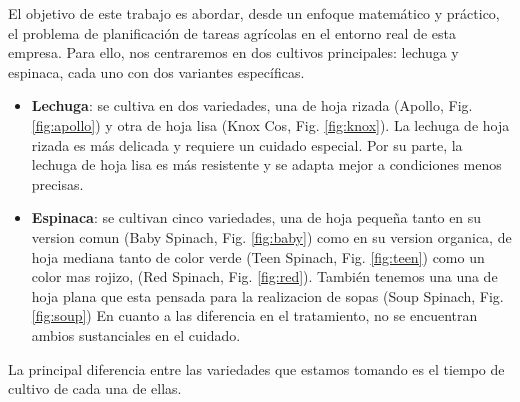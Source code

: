 El objetivo de este trabajo es abordar, desde un enfoque matemático y práctico, el problema de planificación de tareas agrícolas en el entorno real de esta empresa.
Para ello, nos centraremos en dos cultivos principales: lechuga y espinaca, cada uno con dos variantes específicas.
\begin{itemize}
    \item \textbf{Lechuga}: se cultiva en dos variedades, una de hoja rizada (Apollo, Fig. \ref{fig:apollo}) y otra de hoja lisa (Knox Cos, Fig. \ref{fig:knox}). La lechuga de hoja rizada es más delicada y requiere un cuidado especial. Por su parte, la lechuga de hoja lisa es más resistente y se adapta mejor a condiciones menos precisas.
    \item \textbf{Espinaca}: se cultivan cinco variedades, una de hoja pequeña tanto en su version comun (Baby Spinach, Fig. \ref{fig:baby}) como en su version organica, de hoja mediana tanto de color verde (Teen Spinach, Fig. \ref{fig:teen}) como un color mas rojizo, (Red Spinach, Fig. \ref{fig:red}). También tenemos una 
    una de hoja plana que esta pensada para la realizacion de sopas (Soup Spinach, Fig. \ref{fig:soup})
    En cuanto a las diferencia en el tratamiento, no se encuentran ambios sustanciales en el cuidado.
\end{itemize}
La principal diferencia entre las variedades que estamos tomando es el tiempo de cultivo de cada una de ellas.
